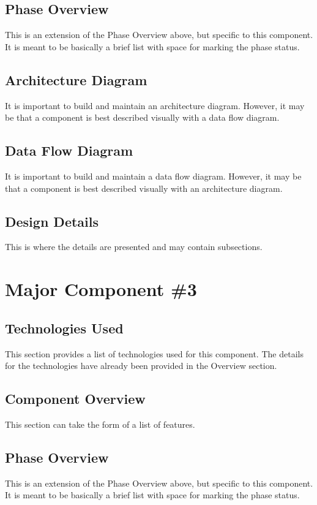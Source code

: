 \subsection{Phase Overview}
This is an extension of the Phase Overview above, but specific to this component. 
 It is meant to be basically a brief list with space for marking the phase status. 

\subsection{ Architecture  Diagram}
It is important to build and maintain an architecture diagram.  However, it may 
be that a component is best described visually with a data flow diagram. 


\subsection{Data Flow Diagram}
It is important to build and maintain a data flow diagram.  However, it may be 
that a component is best described visually with an architecture diagram. 


\subsection{Design Details}
This is where the details are presented and may contain subsections. 


\section{Major Component \#3 }

\subsection{Technologies  Used}
This section provides a list of technologies used for this component.  The details 
for the technologies have already been provided in the Overview section. 

\subsection{Component  Overview}
This section can take the form of a list of features. 

\subsection{Phase Overview}
This is an extension of the Phase Overview above, but specific to this component. 
 It is meant to be basically a brief list with space for marking the phase status. 


